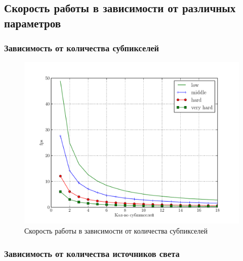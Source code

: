 \documentclass[12pt, a4paper, utf8]{article}
\begin{document}
\subsection{Скорость работы в зависимости от различных параметров}

\subsubsection{Зависимость от количества субпикселей}



\begin{figure}[H]
\centering
\includegraphics[width=\textwidth]{perf/performance_aa.pdf}
\caption{Скорость работы в зависимости от количества субпикселей}\label{fig:performance_aa}
\end{figure}

\subsubsection{Зависимость от количества источников света}


\end{document}
